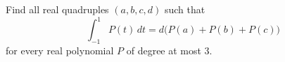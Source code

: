 Find all real quadruples $(a,b,c,d)$ such that
\[\int_{-1}^{1}P(t)\,dt=d\bigl(P(a)+P(b)+P(c)\bigr)\]
for every real polynomial $P$ of degree at most 3.

